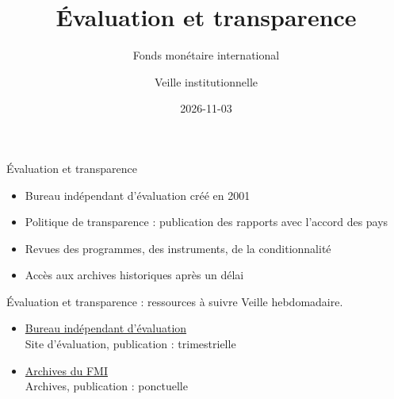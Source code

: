 \documentclass[aspectratio=169,11pt]{beamer}
\title{Évaluation et transparence}
\subtitle{Fonds monétaire international}
\author{Veille institutionnelle}
\date{2026-11-03}
\begin{document}
\begin{frame}\titlepage\end{frame}

\begin{frame}{Évaluation et transparence}
\begin{itemize}
\item Bureau indépendant d'évaluation créé en 2001
\item Politique de transparence : publication des rapports avec l'accord des pays
\item Revues des programmes, des instruments, de la conditionnalité
\item Accès aux archives historiques après un délai
\end{itemize}
\end{frame}

\begin{frame}{Évaluation et transparence : ressources à suivre}
\small
Veille hebdomadaire.
\begin{itemize}
\item \href{https://ieo.imf.org}{Bureau indépendant d'évaluation}\\{\footnotesize Site d'évaluation, publication : trimestrielle}
\item \href{https://www.imf.org/en/About/Archives}{Archives du FMI}\\{\footnotesize Archives, publication : ponctuelle}
\end{itemize}
\end{frame}
\end{document}
